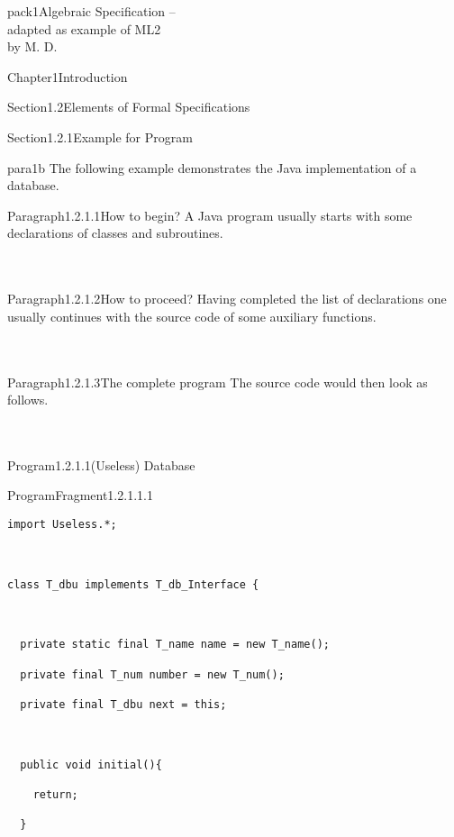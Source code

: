 \documentclass[landscape, slides, light]{mmiss2}
\begin{document}
\begin{Package}{pack1}{Algebraic
Specification -- \\ adapted as example of ML2\\ by M. D.}
\begin{Section}{Chapter1}{Introduction}
\begin{Section}{Section1.2}{Elements of Formal Specifications}{}
\begin{Section}{Section1.2.1}{Example for Program}{}
\begin{Paragraph}{para1b}{}{}
The following example demonstrates the Java implementation of a
database.
\end{Paragraph}
\begin{Paragraph}{Paragraph1.2.1.1}{How to begin?}{}
A Java program usually starts with some declarations of classes and
subroutines.
\newline
\hfill \\
\hfill \\
\hfill \\
\end{Paragraph}
\begin{Paragraph}{Paragraph1.2.1.2}{How to proceed?}{}
Having completed the list of declarations one usually continues with
the source code of some auxiliary functions.
\newline
\hfill \\
\hfill \\
\hfill \\
\end{Paragraph}
\begin{Paragraph}{Paragraph1.2.1.3}{The complete program}{}
The source code would then look as follows.
\newline
\hfill \\
\hfill \\
\hfill \\
\begin{Program}{Program1.2.1.1}{(Useless) Database}{}
\begin{ProgramFragment}{ProgramFragment1.2.1.1.1}{}{}
\tiny
\begin{verbatim}
import Useless.*;



class T_dbu implements T_db_Interface {



  private static final T_name name = new T_name();

  private final T_num number = new T_num();

  private final T_dbu next = this;



  public void initial(){

    return;

  }




\end{verbatim}
\end{ProgramFragment}
\end{Program}
\end{Paragraph}
\end{Section}
\end{Section}
\end{Section}
\end{Package}
\end{document}
